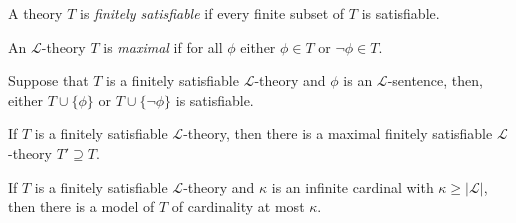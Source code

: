 \documentclass[
	fontsize=10pt, %
]{kaohandt}
\begin{document}
\begin{definition}
    A theory $T$ is \emph{finitely satisfiable} if every finite subset of $T$ is satisfiable.
\end{definition}


\begin{definition}
    An $\mathcal{L}$-theory $T$ is \emph{maximal} if for all $\phi$ either $\phi \in T$ or $\neg \phi \in T$. 
\end{definition}



\begin{lemma}
    Suppose that $T$ is a finitely satisfiable $\mathcal{L}$-theory and $\phi$ is an $\mathcal{L}$-sentence, then,
    either $T \cup \{\phi\}$ or $T \cup \{\neg\phi\}$ is satisfiable.
\end{lemma}

\begin{corollary}
    If $T$ is a finitely satisfiable $\mathcal{L}$-theory,
    then there is a maximal finitely satisfiable $\mathcal{L}$-theory $T' \supseteq T$.
\end{corollary}

\begin{theorem}
    If $T$ is a finitely satisfiable $\mathcal{L}$-theory and $\kappa$ is an infinite cardinal with $\kappa \ge |\mathcal{L}|$,
    then there is a model of $T$ of cardinality at most $\kappa$. 
\end{theorem}
\end{document}
